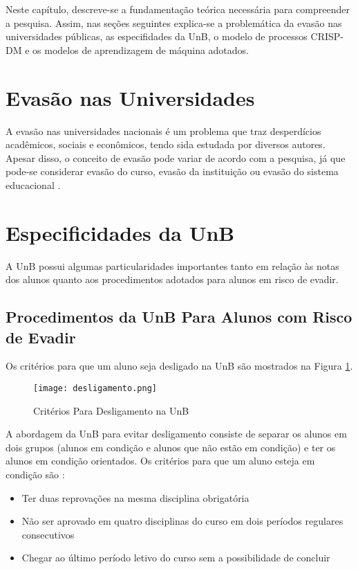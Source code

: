Neste capítulo, descreve-se a fundamentação teórica necessária para compreender a
pesquisa. Assim, nas seções seguintes explica-se a problemática da evasão nas universidades
públicas, as especifidades da UnB, o modelo de processos
CRISP-DM e os modelos de aprendizagem de máquina adotados. 

\section{Evasão nas Universidades} 
A evasão nas universidades nacionais é um problema que traz desperdícios acadêmicos,
sociais e econômicos, tendo sida estudada por diversos autores. Apesar disso, o
conceito de evasão pode variar  de acordo com a pesquisa,
já que pode-se considerar evasão do curso, evasão da instituição ou evasão do
sistema educacional \cite{mec_conceito_evasao}. 

\section{Especificidades da UnB}
A UnB possui algumas particularidades importantes tanto em relação às notas dos
alunos quanto aos procedimentos adotados para alunos em risco de evadir. 

\subsection{Procedimentos da UnB Para Alunos com Risco de Evadir}
\par Os critérios para que um aluno seja desligado na UnB são mostrados na Figura
\ref{desligamento}. 
\begin{figure}[!ht]
    \caption{Critérios Para Desligamento na UnB}
    \centering
    \texttt{[image: desligamento.png]}
    \label{desligamento}
\end{figure}
 
A abordagem da UnB para evitar desligamento consiste de separar os alunos em dois
grupos (alunos em condição e alunos que não estão em condição) e ter os alunos em
condição orientados. Os critérios para que um aluno esteja em condição são
\cite{manual_calouro}: 
\begin{itemize}
    \item Ter duas reprovações na mesma disciplina obrigatória
    \item Não ser aprovado em quatro disciplinas do curso em dois períodos regulares
        consecutivos
    \item Chegar ao último período letivo do curso sem a possibilidade de concluir
\end{itemize}

